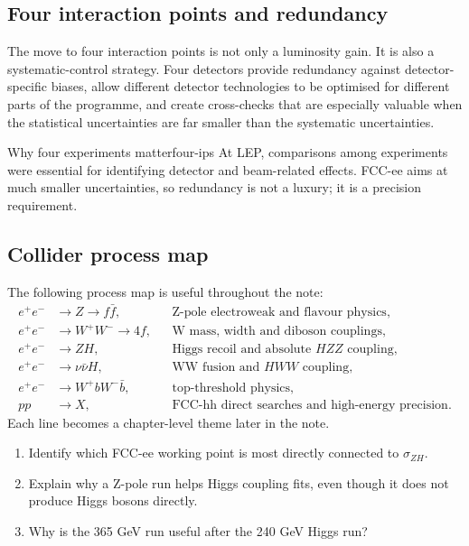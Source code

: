 \documentclass[11pt,a4paper]{article}
\numberwithin{equation}{section}
\begin{document}
\subsection{Four interaction points and redundancy}
The move to four interaction points is not only a luminosity gain. It is also a systematic-control strategy. Four detectors provide redundancy against detector-specific biases, allow different detector technologies to be optimised for different parts of the programme, and create cross-checks that are especially valuable when the statistical uncertainties are far smaller than the systematic uncertainties.

\begin{remarkbox}{Why four experiments matter}{four-ips}
At LEP, comparisons among experiments were essential for identifying detector and beam-related effects. FCC-ee aims at much smaller uncertainties, so redundancy is not a luxury; it is a precision requirement.
\end{remarkbox}

\subsection{Collider process map}
The following process map is useful throughout the note:
\begin{align}
  e^+e^- &\to Z \to f\bar f, && \text{Z-pole electroweak and flavour physics},\\
  e^+e^- &\to W^+W^- \to 4f, && \text{W mass, width and diboson couplings},\\
  e^+e^- &\to ZH, && \text{Higgs recoil and absolute \(HZZ\) coupling},\\
  e^+e^- &\to \nu\bar\nu H, && \text{WW fusion and \(HWW\) coupling},\\
  e^+e^- &\to W^+bW^-\bar b, && \text{top-threshold physics},\\
  pp &\to X, && \text{FCC-hh direct searches and high-energy precision}.
\end{align}
Each line becomes a chapter-level theme later in the note.

\begin{guidedchecksbox}
\begin{enumerate}[leftmargin=1.6em]
\item Identify which FCC-ee working point is most directly connected to \(\sigma_{ZH}\).
\item Explain why a Z-pole run helps Higgs coupling fits, even though it does not produce Higgs bosons directly.
\item Why is the 365 GeV run useful after the 240 GeV Higgs run?
\end{enumerate}
\end{guidedchecksbox}
\end{document}
